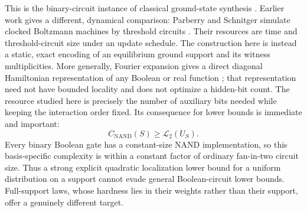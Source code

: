 \documentclass{article}
\newcommand{\LC}{\mathcal{L}}
\begin{document}
This is the binary-circuit instance of classical ground-state synthesis
\cite{guperales12}.  Earlier work gives a different, dynamical comparison:
Parberry and Schnitger simulate clocked Boltzmann machines by threshold
circuits \cite{parberryschnitger89}.  Their resources are time and
threshold-circuit size under an update schedule.  The construction here is
instead a static, exact encoding of an equilibrium ground support and its
witness multiplicities.  More generally, Fourier expansion gives a direct
diagonal Hamiltonian representation of any Boolean or real function
\cite{hadfield21}; that representation need not have bounded locality and does
not optimize a hidden-bit count.  The resource studied here is precisely the
number of auxiliary bits needed while keeping the interaction order fixed.
Its consequence for lower bounds is immediate and important:
\[
  C_{\mathrm{NAND}}(S)\ge \LC_2(U_S).
\]
Every binary Boolean gate has a constant-size NAND implementation, so this
basis-specific complexity is within a constant factor of ordinary fan-in-two
circuit size.  Thus a strong explicit quadratic localization lower bound for a
uniform distribution on a support cannot evade general Boolean-circuit lower
bounds.  Full-support
laws, whose hardness lies in their weights rather than their support, offer a
genuinely different target.
\end{document}
